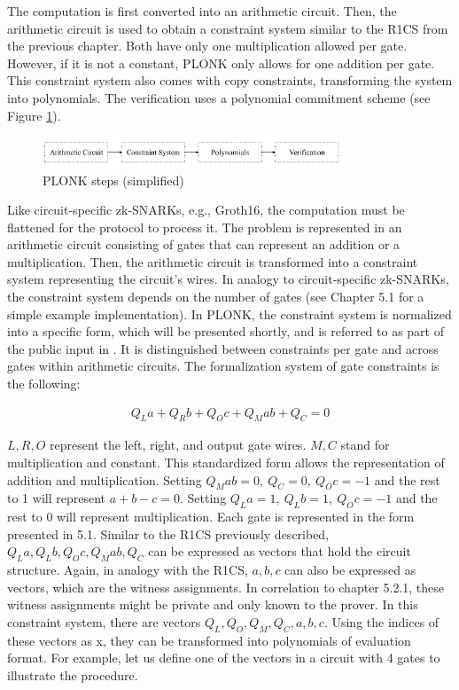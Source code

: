 The computation is first converted into an arithmetic circuit. Then, the arithmetic circuit is used to obtain a constraint system similar to the R1CS from the previous chapter. Both have only one multiplication allowed per gate. However, if it is not a constant, PLONK only allows for one addition per gate. This constraint system also comes with copy constraints, transforming the system into polynomials. The verification uses a polynomial commitment scheme (see Figure \ref{fig:plonk}).

\begin{figure}[hbt]
	\centering
		\includegraphics[width=0.8\textwidth]{Pictures/plonk_process.png}
	\caption{PLONK steps (simplified)}
	\label{fig:plonk}
\end{figure}

Like circuit-specific zk-SNARKs, e.g., Groth16, the computation must be flattened for the protocol to process it. The problem is represented in an arithmetic circuit consisting of gates that can represent an addition or a multiplication. Then, the arithmetic circuit is transformed into a constraint system representing the circuit's wires. In analogy to circuit-specific zk-SNARKs, the constraint system depends on the number of gates (see Chapter 5.1 for a simple example implementation). In PLONK, the constraint system is normalized into a specific form, which will be presented shortly, and is referred to as part of the public input in \citet{PLONKcryptoeprint:2019/953}. 
It is distinguished between constraints per gate and across gates within arithmetic circuits. The formalization system of gate constraints is the following:

\begin{align}
    Q_{L}a + Q_{R}b + Q_{O}c + Q_{M}ab + Q_C = 0
\end{align}

\(L, R, O\) represent the left, right, and output gate wires. \(M, C\) stand for multiplication and constant. This standardized form allows the representation of addition and multiplication. Setting \(Q_{M}ab = 0, \ Q_C=0, \ Q_{O}c = -1 \) and the rest to 1 will represent \(a + b - c = 0\). Setting \(Q_{L}a =1,\ Q_{L}b =1,\ Q_{O}c = -1\) and the rest to 0 will represent multiplication. Each gate is represented in the form presented in 5.1. Similar to the R1CS previously described, \(Q_{L}a, Q_{L}b, Q_{O}c, Q_{M}ab, Q_C\) can be expressed as vectors that hold the circuit structure. Again, in analogy with the R1CS, \(a, b, c\) can also be expressed as vectors, which are the witness assignments. In correlation to chapter 5.2.1, these witness assignments might be private and only known to the prover.
In this constraint system, there are vectors \(Q_{L}, Q_{O}, Q_{M}, Q_C, a, b, c\). Using the indices of these vectors as x, they can be transformed into polynomials of evaluation format. For example, let us define one of the vectors in a circuit with 4 gates to illustrate the procedure. 

